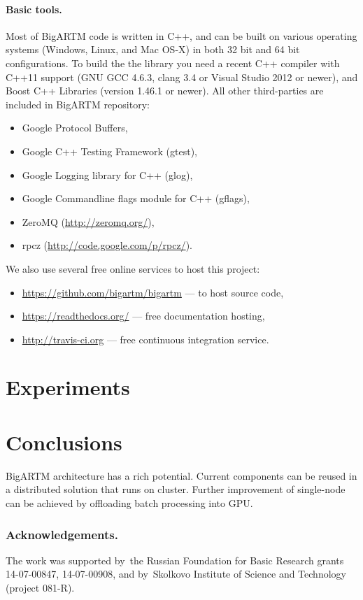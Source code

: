 \documentclass{llncs}
\begin{document}
\paragraph{Basic tools.}
Most of BigARTM code is written in C++,
and can be built on various operating systems (Windows, Linux, and Mac OS-X)
in both 32 bit and 64 bit configurations.
To build the the library you need a recent C++ compiler with C++11 support (GNU GCC 4.6.3, clang 3.4 or Visual Studio 2012 or newer),
and Boost C++ Libraries (version 1.46.1 or newer).
All other third-parties are included in BigARTM repository:
\begin{itemize}
\item Google Protocol Buffers,
\item Google C++ Testing Framework (gtest),
\item Google Logging library for C++ (glog),
\item Google Commandline flags module for C++ (gflags),
\item ZeroMQ (\url{http://zeromq.org/}),
\item rpcz (\url{http://code.google.com/p/rpcz/}).
\end{itemize}
We also use several free online services to host this project:
\begin{itemize}
\item \url{https://github.com/bigartm/bigartm} --- to host source code,
\item \url{https://readthedocs.org/} --- free documentation hosting,
\item \url{http://travis-ci.org} --- free continuous integration service.
\end{itemize}

\section{Experiments}
\label{sec:Experiments}

\section{Conclusions}
\label{sec:Conclusions}

BigARTM architecture has a rich potential.
Current components can be reused in a distributed solution that runs on cluster.
Further improvement of single-node can be achieved by offloading batch processing into GPU.

\bigskip
\subsubsection*{Acknowledgements.}
    The work was supported by~the Russian Foundation for Basic Research grants 14-07-00847, 14-07-00908,
    and by~Skolkovo Institute of Science and Technology (project 081-R).



%


\end{document}
